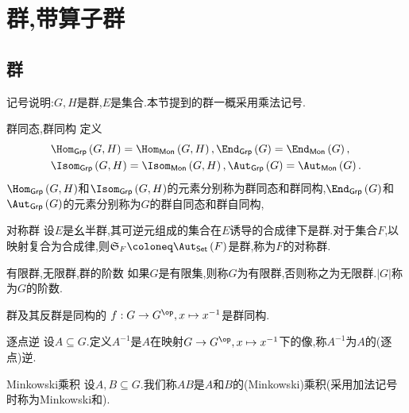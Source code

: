 \chapter{群,带算子群}

\section{群}

记号说明:$G,H$是群,$E$是集合.本节提到的群一概采用乘法记号.	

\begin{definition}{群同态,群同构}{}
	定义
	\begin{align*}
		&\Hom_{\mathsf{Grp}}\left(G,H\right)=\Hom_{\mathsf{Mon}}\left(G,H\right),\End_{\mathsf{Grp}}\left(G\right)=\End_{\mathsf{Mon}}\left(G\right),\\
		&\Isom_{\mathsf{Grp}}\left(G,H\right)=\Isom_{\mathsf{Mon}}\left(G,H\right),\Aut_{\mathsf{Grp}}\left(G\right)=\Aut_{\mathsf{Mon}}\left(G\right).
	\end{align*}
	$\Hom_{\mathsf{Grp}}\left(G,H\right)$和$\Isom_{\mathsf{Grp}}\left(G,H\right)$的元素分别称为群同态和群同构,$\End_{\mathsf{Grp}}\left(G\right)$和$\Aut_{\mathsf{Grp}}\left(G\right)$的元素分别称为$G$的群自同态和群自同构,
\end{definition}

\begin{example}{对称群}{}
	设$E$是幺半群,其可逆元组成的集合在$E$诱导的合成律下是群.对于集合$F$,以映射复合为合成律,则$\mathfrak{S}_{F}\coloneq\Aut_{\mathsf{Set}}\left(F\right)$是群,称为$F$的对称群.
\end{example}

\begin{definition}{有限群,无限群,群的阶数}{}
	如果$G$是有限集,则称$G$为有限群,否则称之为无限群.$\left|G\right|$称为$G$的阶数.
\end{definition}

\begin{proposition}{群及其反群是同构的}{}
	$f:G\to G^{\op},x\mapsto x^{-1}$是群同构.
\end{proposition}

\begin{definition}{逐点逆}{}
	设$A\subseteq G$.定义$A^{-1}$是$A$在映射$G\to G^{\op},x\mapsto x^{-1}$下的像,称$A^{-1}$为$A$的(逐点)逆.
\end{definition}

\begin{definition}{Minkowski乘积}{}
	设$A,B\subseteq G$.我们称$AB$是$A$和$B$的(Minkowski)乘积(采用加法记号时称为Minkowski和).
\end{definition}

